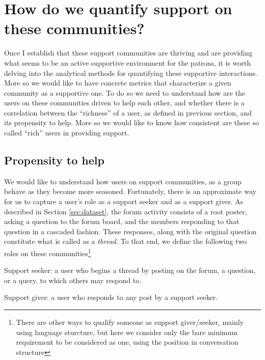 \section{How do we quantify support on these communities?}
\label{sec:support}
Once I establish that these support communities are thriving and are providing what seems to be an active supportive environment for the patrons, it is worth delving into the analytical methods for quantifying these supportive interactions. More so we would like to have concrete metrics that characterize a given community as a supportive one. To do so we need to understand how are the users on these communities driven to help each other, and whether there is a correlation between the ``richness'' of a user, as defined in previous section, and its propensity to help. More so we would like to know how consistent are these so called ``rich'' users in providing support. 

\subsection{Propensity to help} 
We would like to understand how users on support communities, as a group behave as they become more seasoned. Fortunately, there is an approximate way for us to capture a user's role as a support seeker and as a support giver. As described in Section \ref{sec:dataset}, the forum activity consists of a root poster, asking a question to the forum board, and the members responding to that question in a cascaded fashion. These responses, along with the original question constitute what is called as a \textsl{thread}.
To that end, we define the following two roles on these communities\footnote{There are other ways to qualify someone as support giver/seeker, mainly using language sturcture, but here we consider only the bare minimum requirement to be considered as one, using the position in conversation structure}
\begin{definition}
    Support seeker: a user who begins a thread by posting on the forum, a question, or a query, to which others may respond to.
\end{definition}

\begin{definition}
    Support giver: a user who responds to any post by a support seeker.
\end{definition}

